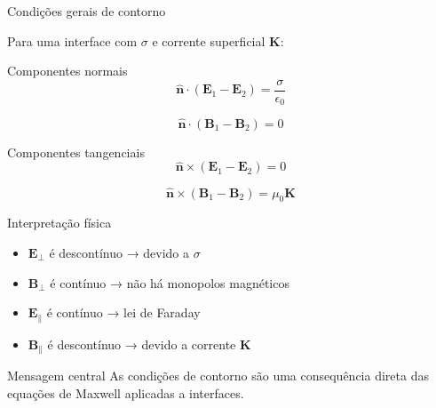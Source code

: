 \documentclass[aspectratio=169]{beamer}
\begin{document}
\begin{frame}{Condições gerais de contorno}
\small

Para uma interface com \(\sigma\) e corrente superficial \(\mathbf{K}\):

\vspace{0.1cm}

\begin{block}{Componentes normais}
\begin{equation*}
\hat{\mathbf{n}}\cdot(\mathbf{E}_1-\mathbf{E}_2)=\frac{\sigma}{\epsilon_0}
\end{equation*}

\begin{equation*}
\hat{\mathbf{n}}\cdot(\mathbf{B}_1-\mathbf{B}_2)=0
\end{equation*}
\end{block}

\vspace{0.1cm}

\begin{block}{Componentes tangenciais}
\begin{equation*}
\hat{\mathbf{n}}\times(\mathbf{E}_1-\mathbf{E}_2)=0
\end{equation*}

\begin{equation}
\hat{\mathbf{n}}\times(\mathbf{B}_1-\mathbf{B}_2)=\mu_0 \mathbf{K}
\tag{2.49}
\end{equation}
\end{block}

\end{frame}

\begin{frame}{Interpretação física}
\small

\begin{itemize}\setlength{\itemsep}{3pt}
\item \(\mathbf{E}_\perp\) é descontínuo → devido a \(\sigma\)
\item \(\mathbf{B}_\perp\) é contínuo → não há monopolos magnéticos
\item \(\mathbf{E}_\parallel\) é contínuo → lei de Faraday
\item \(\mathbf{B}_\parallel\) é descontínuo → devido a corrente \(\mathbf{K}\)
\end{itemize}

\vspace{0.2cm}

\begin{alertblock}{Mensagem central}
As condições de contorno são uma consequência direta das equações de Maxwell aplicadas a interfaces.
\end{alertblock}

\end{frame}
\end{document}
